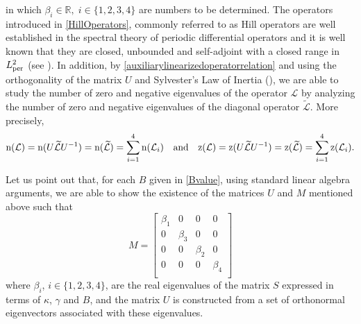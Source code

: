 \documentclass[10pt,reqno,a4paper]{amsart} %
\theoremstyle{definition} %
\numberwithin{equation}{section}
\numberwithin{figure}{section}
\begin{document}
in which $\beta_i \in \mathbb{R},\; i \in \{1,2,3,4\}$ are numbers to be determined. The operators introduced in \eqref{HillOperators}, commonly referred to as Hill operators are well established in the spectral theory of periodic differential operators and it is well known that they are closed, unbounded and self-adjoint with a closed range in $L^2_{\rm per}$ (see \cite[Section 7.2]{AnguloBook}). In addition, by \eqref{auxiliarylinearizedoperatorrelation} and using the orthogonality of the matrix $U$ and Sylvester’s Law of Inertia (\cite[Theorem 4.2]{Pelinovskybook}), we are able to study the number of zero and negative eigenvalues of the operator $\mathcal{L}$ by analyzing the number of zero and negative eigenvalues of the diagonal operator $\widetilde{\mathcal{L}}$. More precisely,
\begin{equation}\label{SylvesterInertialLaw}
    {\rm n}(\mathcal{L}) = {\rm n}(U \widetilde{\mathcal{L}} U^{-1}) = {\rm n}(\widetilde{\mathcal{L}}) = \sum_{i=1}^{4} {\rm n}(\mathcal{L}_i) \quad \text{and} \quad {\rm z}(\mathcal{L}) = {\rm z}(U \widetilde{\mathcal{L}} U^{-1}) = {\rm z}(\widetilde{\mathcal{L}}) = \sum_{i=1}^{4} {\rm z}(\mathcal{L}_i).
\end{equation}

Let us point out that, for each $B$ given in \eqref{Bvalue}, using standard linear algebra arguments, we are able to show the existence of the matrices $U$ and $M$ mentioned above such that
\begin{equation}\label{Mmatrix}
M = \begin{bmatrix}
\beta_1 & 0       & 0       & 0       \\
0       & \beta_3 & 0       & 0       \\
0       & 0       & \beta_2 & 0       \\
0       & 0       & 0       & \beta_4 \\
\end{bmatrix}
\end{equation}
where $\beta_i$, $i \in \{1,2,3,4\}$, are the real eigenvalues of the matrix $S$ expressed in terms of $\kappa$, $\gamma$ and $B$, and the matrix $U$ is constructed from a set of orthonormal eigenvectors associated with these eigenvalues.%
\end{document}
